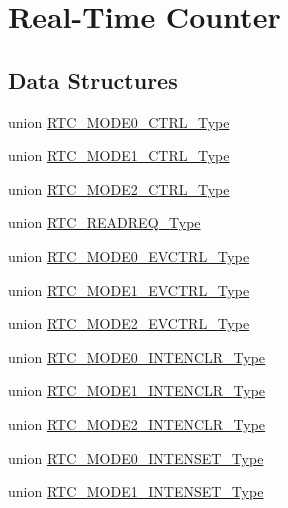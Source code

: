 \hypertarget{group___s_a_m_d21___r_t_c}{}\section{Real-\/\+Time Counter}
\label{group___s_a_m_d21___r_t_c}
\subsection*{Data Structures}
\begin{DoxyCompactItemize}
\item 
union \mbox{\hyperlink{union_r_t_c___m_o_d_e0___c_t_r_l___type}{R\+T\+C\+\_\+\+M\+O\+D\+E0\+\_\+\+C\+T\+R\+L\+\_\+\+Type}}
\item 
union \mbox{\hyperlink{union_r_t_c___m_o_d_e1___c_t_r_l___type}{R\+T\+C\+\_\+\+M\+O\+D\+E1\+\_\+\+C\+T\+R\+L\+\_\+\+Type}}
\item 
union \mbox{\hyperlink{union_r_t_c___m_o_d_e2___c_t_r_l___type}{R\+T\+C\+\_\+\+M\+O\+D\+E2\+\_\+\+C\+T\+R\+L\+\_\+\+Type}}
\item 
union \mbox{\hyperlink{union_r_t_c___r_e_a_d_r_e_q___type}{R\+T\+C\+\_\+\+R\+E\+A\+D\+R\+E\+Q\+\_\+\+Type}}
\item 
union \mbox{\hyperlink{union_r_t_c___m_o_d_e0___e_v_c_t_r_l___type}{R\+T\+C\+\_\+\+M\+O\+D\+E0\+\_\+\+E\+V\+C\+T\+R\+L\+\_\+\+Type}}
\item 
union \mbox{\hyperlink{union_r_t_c___m_o_d_e1___e_v_c_t_r_l___type}{R\+T\+C\+\_\+\+M\+O\+D\+E1\+\_\+\+E\+V\+C\+T\+R\+L\+\_\+\+Type}}
\item 
union \mbox{\hyperlink{union_r_t_c___m_o_d_e2___e_v_c_t_r_l___type}{R\+T\+C\+\_\+\+M\+O\+D\+E2\+\_\+\+E\+V\+C\+T\+R\+L\+\_\+\+Type}}
\item 
union \mbox{\hyperlink{union_r_t_c___m_o_d_e0___i_n_t_e_n_c_l_r___type}{R\+T\+C\+\_\+\+M\+O\+D\+E0\+\_\+\+I\+N\+T\+E\+N\+C\+L\+R\+\_\+\+Type}}
\item 
union \mbox{\hyperlink{union_r_t_c___m_o_d_e1___i_n_t_e_n_c_l_r___type}{R\+T\+C\+\_\+\+M\+O\+D\+E1\+\_\+\+I\+N\+T\+E\+N\+C\+L\+R\+\_\+\+Type}}
\item 
union \mbox{\hyperlink{union_r_t_c___m_o_d_e2___i_n_t_e_n_c_l_r___type}{R\+T\+C\+\_\+\+M\+O\+D\+E2\+\_\+\+I\+N\+T\+E\+N\+C\+L\+R\+\_\+\+Type}}
\item 
union \mbox{\hyperlink{union_r_t_c___m_o_d_e0___i_n_t_e_n_s_e_t___type}{R\+T\+C\+\_\+\+M\+O\+D\+E0\+\_\+\+I\+N\+T\+E\+N\+S\+E\+T\+\_\+\+Type}}
\item 
union \mbox{\hyperlink{union_r_t_c___m_o_d_e1___i_n_t_e_n_s_e_t___type}{R\+T\+C\+\_\+\+M\+O\+D\+E1\+\_\+\+I\+N\+T\+E\+N\+S\+E\+T\+\_\+\+Type}}

\end{DoxyCompactItemize}
